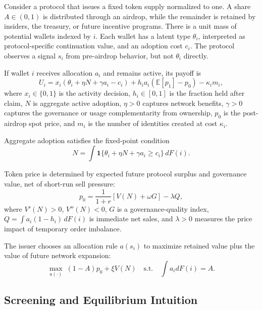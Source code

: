 \documentclass[11pt]{article}
\theoremstyle{remark}
\begin{document}
Consider a protocol that issues a fixed token supply normalized to one. A share $A \in (0,1)$ is distributed through an airdrop, while the remainder is retained by insiders, the treasury, or future incentive programs. There is a unit mass of potential wallets indexed by $i$. Each wallet has a latent type $\theta_i$, interpreted as protocol-specific continuation value, and an adoption cost $c_i$. The protocol observes a signal $s_i$ from pre-airdrop behavior, but not $\theta_i$ directly.

If wallet $i$ receives allocation $a_i$ and remains active, its payoff is
\begin{equation}
U_i = x_i \left( \theta_i + \eta N + \gamma a_i - c_i \right)
+ h_i a_i \left( \mathbb{E}[p_1] - p_0 \right) - \kappa_i m_i,
\label{eq:walletpayoff}
\end{equation}
where $x_i \in \{0,1\}$ is the activity decision, $h_i \in [0,1]$ is the fraction held after claim, $N$ is aggregate active adoption, $\eta > 0$ captures network benefits, $\gamma > 0$ captures the governance or usage complementarity from ownership, $p_0$ is the post-airdrop spot price, and $m_i$ is the number of identities created at cost $\kappa_i$.

Aggregate adoption satisfies the fixed-point condition
\begin{equation}
N = \int \mathbf{1}\{ \theta_i + \eta N + \gamma a_i \ge c_i \} \, dF(i).
\label{eq:adoptionfixedpoint}
\end{equation}

Token price is determined by expected future protocol surplus and governance value, net of short-run sell pressure:
\begin{equation}
p_0 = \frac{1}{1+r}\left[V(N) + \omega G \right] - \lambda Q,
\label{eq:price}
\end{equation}
where $V'(N)>0$, $V''(N)<0$, $G$ is a governance-quality index, $Q = \int a_i(1-h_i)\,dF(i)$ is immediate net sales, and $\lambda > 0$ measures the price impact of temporary order imbalance.

The issuer chooses an allocation rule $a(s_i)$ to maximize retained value plus the value of future network expansion:
\begin{equation}
\max_{a(\cdot)} \; (1-A)p_0 + \xi V(N)
\quad
\text{s.t.}
\quad
\int a_i dF(i) = A.
\label{eq:issuerproblem}
\end{equation}

\subsection{Screening and Equilibrium Intuition}
\end{document}
